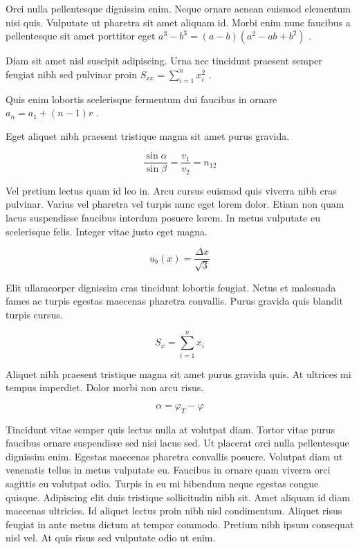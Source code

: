\documentclass{article}
\begin{document}
	
    Orci nulla pellentesque dignissim enim. Neque ornare aenean euismod elementum nisi quis. Vulputate ut pharetra sit amet aliquam id. Morbi enim nunc faucibus a pellentesque sit amet porttitor eget  
    \begin{math}
    	a^3-b^3=(a-b)(a^2-ab+b^2)
    \end{math}
    .
    \newline
    
   Diam sit amet nisl suscipit adipiscing. Urna nec tincidunt praesent semper feugiat nibh sed pulvinar proin 
   $ S_{xx}=\sum_{i=1}^{n}x_i^2 $
   .
   \newline
    
    Quis enim lobortis scelerisque fermentum dui faucibus in ornare 
    \( a_n=a_1+(n-1)r \)
    .
    \newline
    
    Eget aliquet nibh praesent tristique magna sit amet purus gravida.
    
    \[ \frac{\sin \alpha}{\sin \beta}=\frac{v_1}{v_2}=n_{12}  \]
    
    Vel pretium lectus quam id leo in. Arcu cursus euismod quis viverra nibh cras pulvinar. Varius vel pharetra vel turpis nunc eget lorem dolor. Etiam non quam lacus suspendisse faucibus interdum posuere lorem. In metus vulputate eu scelerisque felis. Integer vitae justo eget magna.
    
    $$ u_b(x)=\frac{\Delta x}{\sqrt{3}} $$
    
    Elit ullamcorper dignissim cras tincidunt lobortis feugiat. Netus et malesuada fames ac turpis egestas maecenas pharetra convallis. Purus gravida quis blandit turpis cursus. 
    
    \begin{displaymath}
    	S_x=\sum_{i=1}^{n}x_i
    \end{displaymath}
    
    Aliquet nibh praesent tristique magna sit amet purus gravida quis. At ultrices mi tempus imperdiet. Dolor morbi non arcu risus.
    
    \begin{equation}
    	\alpha=\varphi_T-\varphi
    \end{equation}
    
    Tincidunt vitae semper quis lectus nulla at volutpat diam. Tortor vitae purus faucibus ornare suspendisse sed nisi lacus sed. Ut placerat orci nulla pellentesque dignissim enim. Egestas maecenas pharetra convallis posuere. Volutpat diam ut venenatis tellus in metus vulputate eu. Faucibus in ornare quam viverra orci sagittis eu volutpat odio. Turpis in eu mi bibendum neque egestas congue quisque. Adipiscing elit duis tristique sollicitudin nibh sit. Amet aliquam id diam maecenas ultricies. Id aliquet lectus proin nibh nisl condimentum. Aliquet risus feugiat in ante metus dictum at tempor commodo. Pretium nibh ipsum consequat nisl vel. At quis risus sed vulputate odio ut enim.
    
\end{document}
